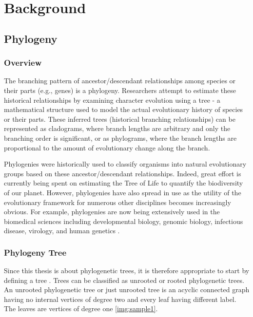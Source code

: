 \chapter{Background}

\newtheorem{defi}{Definition} %

\section{Phylogeny}
\subsection{Overview}

The branching pattern of ancestor/descendant relationships among species or
their parts (e.g., genes) is a phylogeny. Researchers attempt to estimate these 
historical relationships by examining character evolution using a tree - a mathematical
structure used to model the actual evolutionary history of species or their parts.
These inferred trees (historical branching relationships) can be represented as 
cladograms, where branch lengths are arbitrary and only the branching order is significant,
or as phylograms, where the branch lengths are proportional to the amount of evolutionary 
change along the branch.

Phylogenies were historically used to classify organisms into natural evolutionary
groups based on these ancestor/descendant relationships. Indeed, great effort is
currently being spent on estimating the Tree of Life to quantify the biodiversity of
our planet. However, phylogenies have also spread in use as the utility of the
evolutionary framework for numerous other disciplines becomes increasingly obvious. 
For example, phylogenies are now being extensively used in the biomedical sciences 
including developmental biology, genomic biology, infectious disease, virology,
and human genetics \cite{jumpstarting}.

\subsection{Phylogeny Tree}
Since this thesis is about phylogenetic trees, it is therefore 
appropriate to start by defining a tree \cite{alkim}. 
Trees can be classified as unrooted or rooted phylogenetic trees. An 
unrooted phylogenetic tree or just unrooted tree is an acyclic connected 
graph having no internal vertices of degree two and every leaf having 
different label. The leaves are vertices of degree one \ref{img:sample1}.

